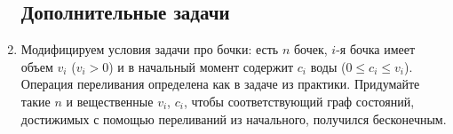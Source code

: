 \begin{enumerate}
\subsection*{Дополнительные задачи}

  \item
    Модифицируем условия задачи про бочки: есть $n$ бочек, $i$-я бочка имеет
    объем $v_i$ ($v_i > 0$) и в начальный момент содержит $c_i$ воды
    ($0 \le c_i \le v_i$). Операция переливания определена как в задаче из практики.
    Придумайте такие $n$ и вещественные $v_i$, $c_i$, чтобы соответствующий граф
    состояний, достижимых с помощью переливаний из начального, получился бесконечным.  

\end{enumerate}
